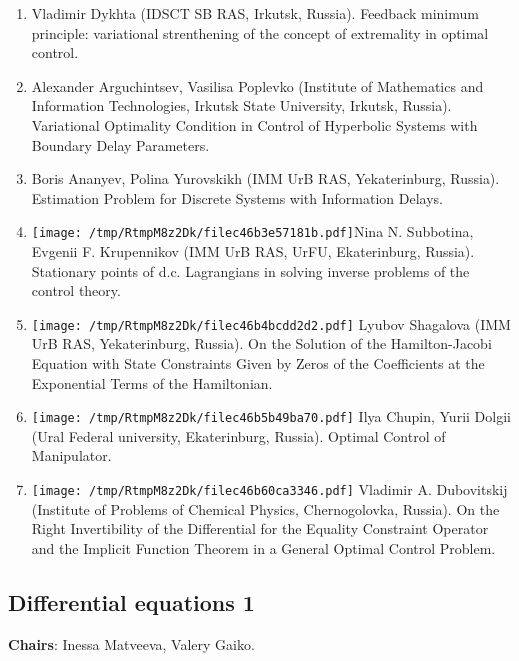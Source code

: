 \documentclass[
]{article}
\providecommand{\tightlist}{%
  \setlength{\itemsep}{0pt}\setlength{\parskip}{0pt}}
\begin{document}
\begin{enumerate}
\def\labelenumi{\arabic{enumi}.}
\tightlist
\item
  Vladimir Dykhta (IDSCT SB RAS, Irkutsk, Russia). Feedback minimum
  principle: variational strenthening of the concept of extremality in
  optimal control.
\item
  Alexander Arguchintsev, Vasilisa Poplevko (Institute of Mathematics
  and Information Technologies, Irkutsk State University, Irkutsk,
  Russia). Variational Optimality Condition in Control of Hyperbolic
  Systems with Boundary Delay Parameters.
\item
  Boris Ananyev, Polina Yurovskikh (IMM UrB RAS, Yekaterinburg, Russia).
  Estimation Problem for Discrete Systems with Information Delays.
\item
  \protect\texttt{[image: /tmp/RtmpM8z2Dk/filec46b3e57181b.pdf]}Nina
  N. Subbotina, Evgenii F. Krupennikov (IMM UrB RAS, UrFU, Ekaterinburg,
  Russia). Stationary points of d.c. Lagrangians in solving inverse
  problems of the control theory.
\item
  \protect\texttt{[image: /tmp/RtmpM8z2Dk/filec46b4bcdd2d2.pdf]}
  Lyubov Shagalova (IMM UrB RAS, Yekaterinburg, Russia). On the Solution
  of the Hamilton-Jacobi Equation with State Constraints Given by Zeros
  of the Coefficients at the Exponential Terms of the Hamiltonian.
\item
  \protect\texttt{[image: /tmp/RtmpM8z2Dk/filec46b5b49ba70.pdf]}
  Ilya Chupin, Yurii Dolgii (Ural Federal university, Ekaterinburg,
  Russia). Optimal Control of Manipulator.
\item
  \protect\texttt{[image: /tmp/RtmpM8z2Dk/filec46b60ca3346.pdf]}
  Vladimir A. Dubovitskij (Institute of Problems of Chemical Physics,
  Chernogolovka, Russia). On the Right Invertibility of the Differential
  for the Equality Constraint Operator and the Implicit Function Theorem
  in a General Optimal Control Problem.
\end{enumerate}

\hypertarget{de1}{%
\subsection{Differential equations 1}\label{de1}}

\textbf{Chairs}: Inessa Matveeva, Valery Gaiko.
\end{document}
